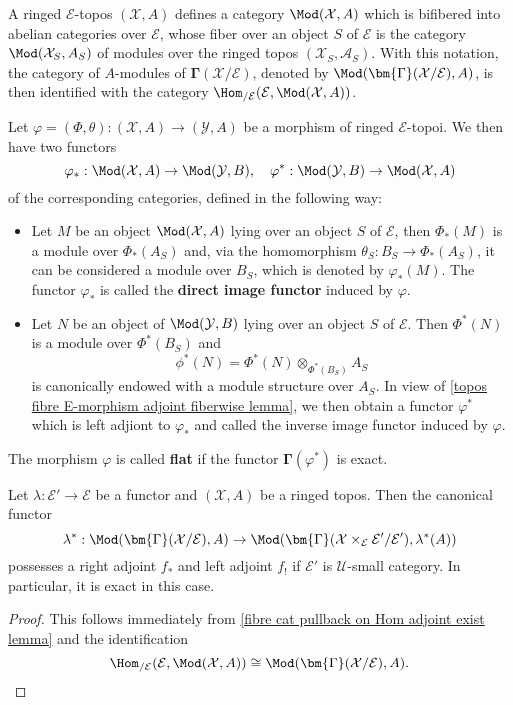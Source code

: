 A ringed $\mathcal{E}$-topos $(\mathcal{X},A)$ defines a category $\Mod(\mathcal{X},A)$ which is bifibered into abelian categories over $\mathcal{E}$, whose fiber over an object $S$ of $\mathcal{E}$ is the category $\Mod(\mathcal{X}_S,A_S)$ of modules over the ringed topos $(\mathcal{X}_S,\mathcal{A}_S)$. With this notation, the category of $A$-modules of $\bm{\Gamma}(\mathcal{X}/\mathcal{E})$, denoted by $\Mod(\bm{\Gamma}(\mathcal{X}/\mathcal{E}),A)$, is then identified with the category $\Hom_{/\mathcal{E}}(\mathcal{E},\Mod(\mathcal{X},A))$.\par
Let $\varphi=(\Phi,\theta):(\mathcal{X},A)\to(\mathcal{Y},A)$ be a morphism of ringed $\mathcal{E}$-topoi. We then have two functors
\[\varphi_*:\Mod(\mathcal{X},A)\to\Mod(\mathcal{Y},B),\quad \varphi^*:\Mod(\mathcal{Y},B)\to\Mod(\mathcal{X},A)\]
of the corresponding categories, defined in the following way:
\begin{itemize}
    \item Let $M$ be an object $\Mod(\mathcal{X},A)$ lying over an object $S$ of $\mathcal{E}$, then $\Phi_*(M)$ is a module over $\Phi_*(A_S)$ and, via the homomorphism $\theta_S:B_S\to\Phi_*(A_S)$, it can be considered a module over $B_S$, which is denoted by $\varphi_*(M)$. The functor $\varphi_*$ is called the \textbf{direct image functor} induced by $\varphi$.
    \item Let $N$ be an object of $\Mod(\mathcal{Y},B)$ lying over an object $S$ of $\mathcal{E}$. Then $\Phi^*(N)$ is a module over $\Phi^*(B_S)$ and
    \[\phi^*(N)=\Phi^*(N)\otimes_{\Phi^*(B_S)}A_S\]
    is canonically endowed with a module structure over $A_S$. In view of \ref{topos fibre E-morphism adjoint fiberwise lemma}, we then obtain a functor $\varphi^*$ which is left adjiont to $\varphi_*$ and called the inverse image functor induced by $\varphi$.
\end{itemize}
The morphism $\varphi$ is called \textbf{flat} if the functor $\bm{\Gamma}(\varphi^*)$ is exact.
\begin{proposition}
Let $\lambda:\mathcal{E}'\to\mathcal{E}$ be a functor and $(\mathcal{X},A)$ be a ringed topos. Then the canonical functor
\[\lambda^*:\Mod(\bm{\Gamma}(\mathcal{X}/\mathcal{E}),A)\to\Mod(\bm{\Gamma}(\mathcal{X}\times_\mathcal{E}\mathcal{E}'/\mathcal{E}'),\lambda^*(A))\]
possesses a right adjoint $f_*$ and left adjoint $f_!$ if $\mathcal{E}'$ is $\mathscr{U}$-small category. In particular, it is exact in this case.
\end{proposition}
\begin{proof}
This follows immediately from \cref{fibre cat pullback on Hom adjoint exist lemma} and the identification
\begin{equation*}
\Hom_{/\mathcal{E}}(\mathcal{E},\Mod(\mathcal{X},A))\cong\Mod(\bm{\Gamma}(\mathcal{X}/\mathcal{E}),A).\qedhere
\end{equation*}
\end{proof}

